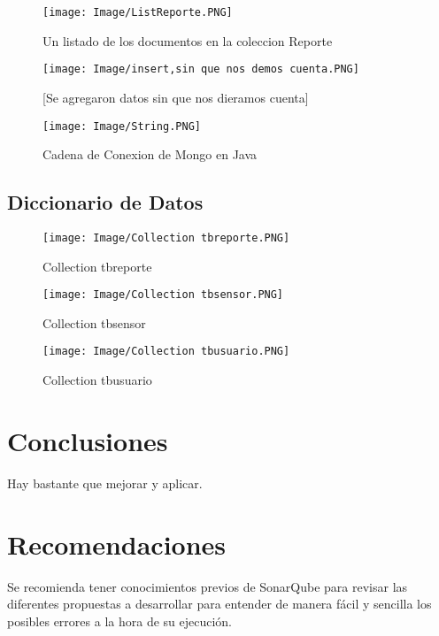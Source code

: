 \documentclass[twoside,twocolumn]{article}
\begin{document}
\begin{itemize}
\begin{figure}[h!]
\centering
\texttt{[image: Image/ListReporte.PNG]}
\caption{Un listado de los documentos en la coleccion Reporte}
\label{fig:Csha3}
\end{figure}

\begin{figure}[h!]
\centering
\texttt{[image: Image/insert,sin que nos demos cuenta.PNG]}
\caption{[Se agregaron datos sin que nos dieramos cuenta]}
\label{fig:Csha3}
\end{figure}

\begin{figure}[h!]
\centering
\texttt{[image: Image/String.PNG]}
\caption{Cadena de Conexion de Mongo en Java}
\label{fig:Csha3}
\end{figure}

\clearpage

\subsection{Diccionario de Datos}

\begin{figure}[h!]
\centering
\texttt{[image: Image/Collection tbreporte.PNG]}
\caption{Collection tbreporte}
\label{fig:Csha3}
\end{figure}

\begin{figure}[h!]
\centering
\texttt{[image: Image/Collection tbsensor.PNG]}
\caption{Collection tbsensor}
\label{fig:Csha3}
\end{figure}

\begin{figure}[h!]
\centering
\texttt{[image: Image/Collection tbusuario.PNG]}
\caption{Collection tbusuario}
\label{fig:Csha3}
\end{figure}


\section{Conclusiones}
Hay bastante que mejorar y aplicar.

\section{Recomendaciones}
Se recomienda tener conocimientos previos de SonarQube para revisar las diferentes propuestas a desarrollar para entender de manera fácil y sencilla los posibles errores a la hora de su ejecución.


\end{itemize}
\end{document}
